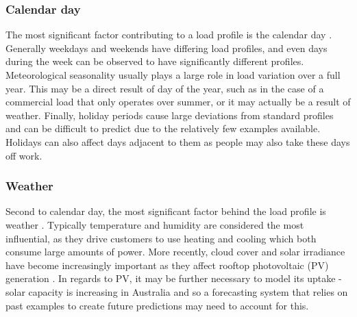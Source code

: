 \subsubsection{Calendar day}
The most significant factor contributing to a load profile is the calendar day \citep{Weron2006}.
Generally weekdays and weekends have differing load profiles, and even days during the week can be observed to have significantly different profiles.
Meteorological seasonality usually plays a large role in load variation over a full year.
This may be a direct result of day of the year, such as in the case of a commercial load that only operates over summer, or it may actually be a result of weather.
Finally, holiday periods cause large deviations from standard profiles and can be difficult to predict due to the relatively few examples available.
Holidays can also affect days adjacent to them as people may also take these days off work.

\subsubsection{Weather}
Second to calendar day, the most significant factor behind the load profile is weather \citep{Hippert2001}.
Typically temperature and humidity are considered the most influential, as they drive customers to use heating and cooling which both consume large amounts of power.
More recently, cloud cover and solar irradiance have become increasingly important as they affect rooftop photovoltaic (PV) generation \cite{AEMO2017}.
In regards to PV, it may be further necessary to model its uptake - solar capacity is increasing in Australia \citep{Jacobs2017} and so a forecasting system that relies on past examples to create future predictions may need to account for this.

